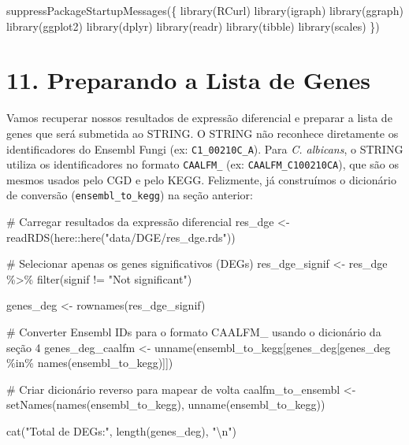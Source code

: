 \documentclass[
  letterpaper,
  DIV=11,
  numbers=noendperiod]{scrreprt}
\newenvironment{Shaded}{\begin{snugshade}}{\end{snugshade}}
\newcommand{\CommentTok}[1]{\textcolor[rgb]{0.37,0.37,0.37}{#1}}
\newcommand{\FunctionTok}[1]{\textcolor[rgb]{0.28,0.35,0.67}{#1}}
\newcommand{\NormalTok}[1]{\textcolor[rgb]{0.00,0.23,0.31}{#1}}
\newcommand{\OtherTok}[1]{\textcolor[rgb]{0.00,0.23,0.31}{#1}}
\newcommand{\SpecialCharTok}[1]{\textcolor[rgb]{0.37,0.37,0.37}{#1}}
\newcommand{\StringTok}[1]{\textcolor[rgb]{0.13,0.47,0.30}{#1}}
\begin{document}
\begin{Shaded}
\begin{Highlighting}[]
\FunctionTok{suppressPackageStartupMessages}\NormalTok{(\{}
  \FunctionTok{library}\NormalTok{(RCurl)}
  \FunctionTok{library}\NormalTok{(igraph)}
  \FunctionTok{library}\NormalTok{(ggraph)}
  \FunctionTok{library}\NormalTok{(ggplot2)}
  \FunctionTok{library}\NormalTok{(dplyr)}
  \FunctionTok{library}\NormalTok{(readr)}
  \FunctionTok{library}\NormalTok{(tibble)}
  \FunctionTok{library}\NormalTok{(scales)}
\NormalTok{\})}
\end{Highlighting}
\end{Shaded}

\section{11. Preparando a Lista de
Genes}\label{preparando-a-lista-de-genes}

Vamos recuperar nossos resultados de expressão diferencial e preparar a
lista de genes que será submetida ao STRING. O STRING não reconhece
diretamente os identificadores do Ensembl Fungi (ex:
\texttt{C1\_00210C\_A}). Para \emph{C. albicans}, o STRING utiliza os
identificadores no formato \texttt{CAALFM\_} (ex:
\texttt{CAALFM\_C100210CA}), que são os mesmos usados pelo CGD e pelo
KEGG. Felizmente, já construímos o dicionário de conversão
(\texttt{ensembl\_to\_kegg}) na seção anterior:

\begin{Shaded}
\begin{Highlighting}[]
\CommentTok{\# Carregar resultados da expressão diferencial}
\NormalTok{res\_dge }\OtherTok{\textless{}{-}} \FunctionTok{readRDS}\NormalTok{(here}\SpecialCharTok{::}\FunctionTok{here}\NormalTok{(}\StringTok{"data/DGE/res\_dge.rds"}\NormalTok{))}

\CommentTok{\# Selecionar apenas os genes significativos (DEGs)}
\NormalTok{res\_dge\_signif }\OtherTok{\textless{}{-}}\NormalTok{ res\_dge }\SpecialCharTok{\%\textgreater{}\%}
  \FunctionTok{filter}\NormalTok{(signif }\SpecialCharTok{!=} \StringTok{"Not significant"}\NormalTok{)}

\NormalTok{genes\_deg }\OtherTok{\textless{}{-}} \FunctionTok{rownames}\NormalTok{(res\_dge\_signif)}

\CommentTok{\# Converter Ensembl IDs para o formato CAALFM\_ usando o dicionário da seção 4}
\NormalTok{genes\_deg\_caalfm }\OtherTok{\textless{}{-}} \FunctionTok{unname}\NormalTok{(ensembl\_to\_kegg[genes\_deg[genes\_deg }\SpecialCharTok{\%in\%} \FunctionTok{names}\NormalTok{(ensembl\_to\_kegg)]])}

\CommentTok{\# Criar dicionário reverso para mapear de volta}
\NormalTok{caalfm\_to\_ensembl }\OtherTok{\textless{}{-}} \FunctionTok{setNames}\NormalTok{(}\FunctionTok{names}\NormalTok{(ensembl\_to\_kegg), }\FunctionTok{unname}\NormalTok{(ensembl\_to\_kegg))}

\FunctionTok{cat}\NormalTok{(}\StringTok{"Total de DEGs:"}\NormalTok{, }\FunctionTok{length}\NormalTok{(genes\_deg), }\StringTok{"}\SpecialCharTok{\textbackslash{}n}\StringTok{"}\NormalTok{)}
\end{Highlighting}
\end{Shaded}
\end{document}
